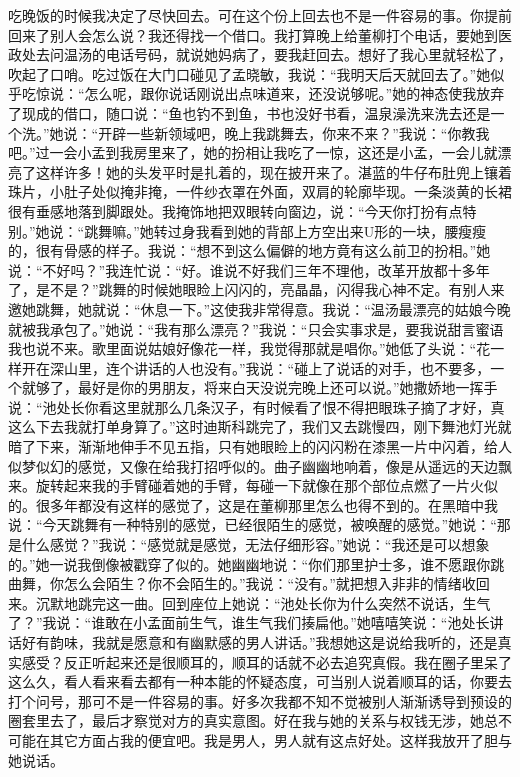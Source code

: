 \documentclass[12pt,oneside]{book}
\begin{document}
吃晚饭的时候我决定了尽快回去。可在这个份上回去也不是一件容易的事。你提前回来了别人会怎么说？我还得找一个借口。我打算晚上给董柳打个电话，要她到医政处去问温汤的电话号码，就说她妈病了，要我赶回去。想好了我心里就轻松了，吹起了口哨。吃过饭在大门口碰见了孟晓敏，我说：``我明天后天就回去了。''她似乎吃惊说：``怎么呢，跟你说话刚说出点味道来，还没说够呢。''她的神态使我放弃了现成的借口，随口说：``鱼也钓不到鱼，书也没好书看，温泉澡洗来洗去还是一个洗。''她说：``开辟一些新领域吧，晚上我跳舞去，你来不来？''我说：``你教我吧。''过一会小孟到我房里来了，她的扮相让我吃了一惊，这还是小孟，一会儿就漂亮了这样许多！她的头发平时是扎着的，现在披开来了。湛蓝的牛仔布肚兜上镶着珠片，小肚子处似掩非掩，一件纱衣罩在外面，双肩的轮廓毕现。一条淡黄的长裙很有垂感地落到脚跟处。我掩饰地把双眼转向窗边，说：``今天你打扮有点特别。''她说：``跳舞嘛。''她转过身我看到她的背部上方空出来U形的一块，腰瘦瘦的，很有骨感的样子。我说：``想不到这么偏僻的地方竟有这么前卫的扮相。''她说：``不好吗？''我连忙说：``好。谁说不好我们三年不理他，改革开放都十多年了，是不是？''跳舞的时候她眼睑上闪闪的，亮晶晶，闪得我心神不定。有别人来邀她跳舞，她就说：``休息一下。''这使我非常得意。我说：``温汤最漂亮的姑娘今晚就被我承包了。''她说：``我有那么漂亮？''我说：``只会实事求是，要我说甜言蜜语我也说不来。歌里面说姑娘好像花一样，我觉得那就是唱你。''她低了头说：``花一样开在深山里，连个讲话的人也没有。''我说：``碰上了说话的对手，也不要多，一个就够了，最好是你的男朋友，将来白天没说完晚上还可以说。''她撒娇地一挥手说：``池处长你看这里就那么几条汉子，有时候看了恨不得把眼珠子摘了才好，真这么下去我就打单身算了。''这时迪斯科跳完了，我们又去跳慢四，刚下舞池灯光就暗了下来，渐渐地伸手不见五指，只有她眼睑上的闪闪粉在漆黑一片中闪着，给人似梦似幻的感觉，又像在给我打招呼似的。曲子幽幽地响着，像是从遥远的天边飘来。旋转起来我的手臂碰着她的手臂，每碰一下就像在那个部位点燃了一片火似的。很多年都没有这样的感觉了，这是在董柳那里怎么也得不到的。在黑暗中我说：``今天跳舞有一种特别的感觉，已经很陌生的感觉，被唤醒的感觉。''她说：``那是什么感觉？''我说：``感觉就是感觉，无法仔细形容。''她说：``我还是可以想象的。''她一说我倒像被戳穿了似的。她幽幽地说：``你们那里护士多，谁不愿跟你跳曲舞，你怎么会陌生？你不会陌生的。''我说：``没有。''就把想入非非的情绪收回来。沉默地跳完这一曲。回到座位上她说：``池处长你为什么突然不说话，生气了？''我说：``谁敢在小孟面前生气，谁生气我们揍扁他。''她嘻嘻笑说：``池处长讲话好有韵味，我就是愿意和有幽默感的男人讲话。''我想她这是说给我听的，还是真实感受？反正听起来还是很顺耳的，顺耳的话就不必去追究真假。我在圈子里呆了这么久，看人看来看去都有一种本能的怀疑态度，可当别人说着顺耳的话，你要去打个问号，那可不是一件容易的事。好多次我都不知不觉被别人渐渐诱导到预设的圈套里去了，最后才察觉对方的真实意图。好在我与她的关系与权钱无涉，她总不可能在其它方面占我的便宜吧。我是男人，男人就有这点好处。这样我放开了胆与她说话。
\end{document}
